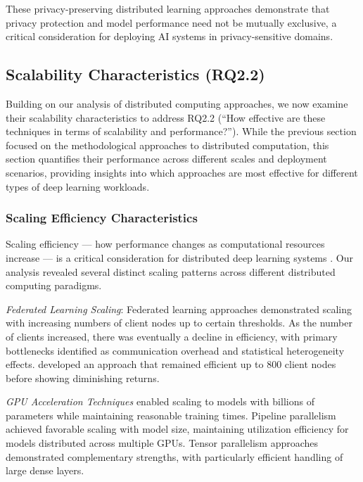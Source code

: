 \documentclass[acmsmall]{acmart}
\begin{document}
These privacy-preserving distributed learning approaches demonstrate that privacy protection and model performance need not be mutually exclusive, a critical consideration for deploying AI systems in privacy-sensitive domains.

\subsection{Scalability Characteristics (RQ2.2)}\label{subsec:scalability-characteristics-rq22}
Building on our analysis of distributed computing approaches, we now examine their scalability characteristics to address RQ2.2 (``How effective are these techniques in terms of scalability and performance?''). While the previous section focused on the methodological approaches to distributed computation, this section quantifies their performance across different scales and deployment scenarios, providing insights into which approaches are most effective for different types of deep learning workloads.

\subsubsection{Scaling Efficiency Characteristics}\label{subsubsec:scalability-characteristics-rq22:scaling-efficiency-characteristics}
Scaling efficiency --- how performance changes as computational resources increase --- is a critical consideration for distributed deep learning systems \citep{Zhang20229876}. Our analysis revealed several distinct scaling patterns across different distributed computing paradigms.

\textit{Federated Learning Scaling}: Federated learning approaches demonstrated scaling with increasing numbers of client nodes up to certain thresholds. As the number of clients increased, there was eventually a decline in efficiency, with primary bottlenecks identified as communication overhead and statistical heterogeneity effects. \citet{Zhang20229876} developed an approach that remained efficient up to 800 client nodes before showing diminishing returns.

\textit{GPU Acceleration Techniques} enabled scaling to models with billions of parameters while maintaining reasonable training times. Pipeline parallelism achieved favorable scaling with model size, maintaining utilization efficiency for models distributed across multiple GPUs. Tensor parallelism approaches demonstrated complementary strengths, with particularly efficient handling of large dense layers.
\end{document}
